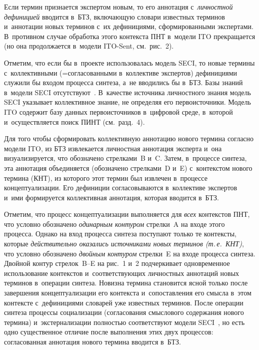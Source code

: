 \begin{multicols}{2}
  Если термин признается экспертом новым, то его аннотация 
  с~\textit{личностной дефиницией} вводится в~БТЗ, включающую словари известных 
терминов и~аннотации новых терминов с~их дефинициями, сформированными 
экспертами. В~противном случае обработка этого контекста ПНТ в~модели ITO 
прекращается (но она продолжается в~модели ITO-Sent, см.\ рис.~2).
  
  Отметим, что если бы в~проекте использовалась модель SECI, то новые 
термины с~коллективными (=\;со\-гла\-со\-ван\-ны\-ми в~коллективе экспертов) 
дефинициями служили бы входом процесса синтеза, а~не вводились бы в~БТЗ. 
Базы знаний в~модели SECI отсутствуют~\cite{8-zac, 9-zac, 10-zac, 11-zac}. 
В~качестве источника личностного знания модель SECI указывает коллективное 
знание, не определяя его первоисточники. Модель ITO содержит базу данных 
первоисточников в~циф\-ро\-вой среде, в~которой и~осуществляется поиск ПИНТ 
(см.\ разд.~4).
  
  Для того чтобы сформировать коллективную аннотацию нового термина 
согласно модели ITO, из БТЗ извлекается личностная аннотация эксперта и~она 
визуализируется, что обозначено стрелками~B и~C. Затем, в~процессе синтеза, эта 
аннотация объединяется (обозначено 
стрелками~D и~E) с~контекстом нового термина (КНТ), из которого этот термин был извлечен в~процессе 
концептуализации. Его дефиниции согласовываются в~коллективе экспертов 
и~ими формируется коллективная аннотация, которая вводится в~БТЗ. 
  
  Отметим, что процесс концептуализации выполняется для \textit{всех} 
контекстов ПНТ, что условно обозначено \textit{одинарным контуром} стрелки~A 
на входе этого процесса. Однако на вход процесса синтеза поступают только те 
контексты, которые \textit{действительно оказались источниками новых 
терминов (т.\,е.\ КНТ)}, что условно обозначено \textit{двойным контуром} стрелки~E на 
входе процесса синтеза. Двойной контур стрелок~B--E на рис.~1 и~2 подчеркивает 
одновременное использование контекстов и~соответствующих личностных 
аннотаций новых терминов в~операции синтеза. Новизна термина становится 
ясной только после завершения концептуализации его кон\-текс\-та и~сопоставления 
его смыс\-ла в~этом кон\-текс\-те с~дефинициями словарей уже известных терминов. 
После операции синтеза процессы социализации (согласования смыс\-ло\-во\-го 
содержания нового термина) и~экстернализации полностью соответствуют модели 
SECI~\cite{9-zac, 10-zac, 11-zac}, но есть одно существенное отличие после 
выполнения этих двух процессов: согласованная аннотация нового термина 
вводится в~БТЗ.
  

\end{multicols}
